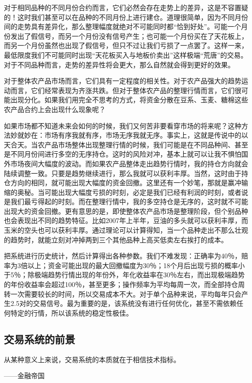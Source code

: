 对于相同品种的不同月份合约而言，它们必然会存在走势上的差异，这是不容置疑的！这时我们甚至可以在品种的不同月份上进行建仓。道理很简单，因为不同月份间的走势具有差异化，那么整理幅度就绝对不可能同时都“恰到好处”。可能一个月份发出了假信号，而另一个月份没有信号产生；也可能一个月份买在了天花板上，而另一个月份虽然也出现了假信号，但只不过让我们亏损了一点罢了。这样一来，最低限度我们不可能同时出现“天花板买入与地板价卖出”这样极端“荒唐”的交易。对于不同品种而言，走势的差异性将会更大，那么自然就会得到更好的效果。

对于整体农产品市场而言，它们具有一定程度的相关性。对于农产品强大的趋势运动而言，它们经常表现为齐涨共跌。但对于整体农产品的整理行情而言，它们很可能出现分化。如果我们用完全不思考的方式，将资金分散在豆系、玉麦、糖棉这些农产品合约上会出现什么现象呢？

如果市场都不知道未来会如何的时候，我们又何苦非要看穿市场的将来呢？这种方法妙就妙在：市场有序我就有序，市场无序我就无序。事实上，这就是传说中的以天合天。当农产品市场整体出现整理行情的时候，我们可能是在不同品种间、甚至是不同月份间进行多空的无序持仓。这时的风险对冲，基本上就可以让我不惧怕国外市场夜间大幅度的波动。而如果农产品整体走出趋势行情时，我的持仓方向就会陆续调整一致。只要是趋势继续进行，那么我就可以获利丰厚。当然，这时由于持仓方向的相同，就可能出现大幅度的资金回撤。这里还有一个妙笔，那就是赢冲输缩的奥秘。当可能出现大幅度亏损的时刻，必定是我们已经有利润的时刻，或者说是我们最亏得起的时刻。而在整理行情中，我的多空持仓是无序的，这时就不可能出现大的资金回撤。更有意思的是，即使整体农产品市场是整理阶段，但个别品种也会表现出不同的趋势特征。比如2007年上半年，豆油的多头就可以获利丰厚，而玉米的空头也可以获利丰厚。通过理论可以计算得知，当一个品种走出不那么壮观的趋势时，就能立刻对冲掉两到三个其他品种上高买低卖左右挨打的成本。

把系统进行历史统计，然后计算得出各种参数。我们不难发现：正确率为40％，赔率为3倍以上；资金可能出现的最大回撤幅度为30％；18个月后出现亏损的概率小于5％；除极端趋势行情出现的年份外，年化收益率在30％左右，而出现极端趋势的年份收益率会超过100％，甚至更多；操作频率为平均每周一次，而全部持仓周转一次需要较长的时间，所以交易成本不大。对于单个品种来说，平均每年只会产生2.5对的交易信号。最为重要的是，该系统没有进行任何优化，甚至不需依赖任何特定的行情，所以该系统的稳定性极佳。

\subsection{交易系统的前景}

{\kaishu
从某种意义上来说，交易系统的本质就在于相信技术指标。

\hfill ——金融帝国
}

